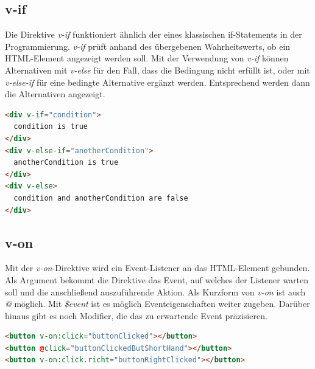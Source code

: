 \subsection*{v-if}
Die Direktive \emph{v-if} funktioniert ähnlich der eines klassischen if-Statements in der Programmierung.
\emph{v-if} prüft anhand des übergebenen Wahrheitswerts, ob ein HTML-Element angezeigt werden soll.
Mit der Verwendung von \emph{v-if} können Alternativen mit \emph{v-else} für den Fall, dass die Bedingung nicht erfüllt ist,
oder mit \emph{v-else-if} für eine bedingte Alternative ergänzt werden.
Entsprechend werden dann die Alternativen angezeigt. \cite{vueDirectives}
\begin{lstlisting}[caption={\emph{v-if}-Direktive},language=html, label={lst:v-if}]
<div v-if="condition">
  condition is true
</div>
<div v-else-if="anotherCondition">
  anotherCondition is true
</div>
<div v-else>
  condition and anotherCondition are false
</div>
\end{lstlisting}

\subsection*{v-on}
Mit der \emph{v-on}-Direktive wird ein Event-Listener an das HTML-Element gebunden.
Als Argument bekommt die Direktive das Event, auf welches der Listener warten soll und
die anschließend auszuführende Aktion.
Als Kurzform von \emph{v-on} ist auch  \emph{@} möglich.
Mit \emph{\$event} ist es möglich Eventeigenschaften weiter zugeben.
Darüber hinaus gibt es noch Modifier, die das zu erwartende Event präzisieren. \cite{vueDirectives}
\begin{lstlisting}[caption={\emph{v-on}-Direktive},language=html, label={lst:v-on}]
<button v-on:click="buttonClicked"></button>
<button @click="buttonClickedButShortHand"></button>
<button v-on:click.richt="buttonRightClicked"></button>
\end{lstlisting}


